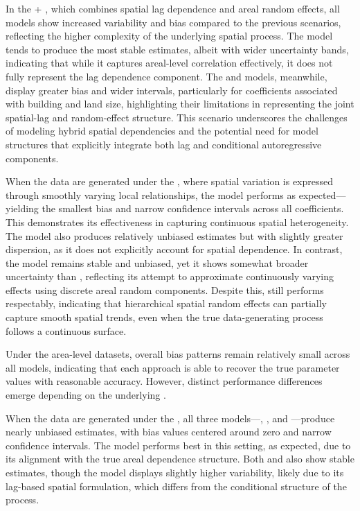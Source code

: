 \documentclass[
  letterpaper,
  DIV=11,
  numbers=noendperiod]{scrartcl}
\begin{document}
In the + , which combines spatial lag
dependence and areal random effects, all models show increased
variability and bias compared to the previous scenarios, reflecting the
higher complexity of the underlying spatial process. The 
model tends to produce the most stable estimates, albeit with wider
uncertainty bands, indicating that while it captures areal-level
correlation effectively, it does not fully represent the lag dependence
component. The  and  models, meanwhile, display
greater bias and wider intervals, particularly for coefficients
associated with building and land size, highlighting their limitations
in representing the joint spatial-lag and random-effect structure. This
scenario underscores the challenges of modeling hybrid spatial
dependencies and the potential need for model structures that explicitly
integrate both lag and conditional autoregressive components.

When the data are generated under the  , where spatial
variation is expressed through smoothly varying local relationships, the
 model performs as expected---yielding the smallest bias and
narrow confidence intervals across all coefficients. This demonstrates
its effectiveness in capturing continuous spatial heterogeneity. The
 model also produces relatively unbiased estimates but with
slightly greater dispersion, as it does not explicitly account for
spatial dependence. In contrast, the  model remains stable
and unbiased, yet it shows somewhat broader uncertainty than ,
reflecting its attempt to approximate continuously varying effects using
discrete areal random components. Despite this,  still
performs respectably, indicating that hierarchical spatial random
effects can partially capture smooth spatial trends, even when the true
data-generating process follows a continuous surface.

Under the area-level datasets, overall bias patterns remain relatively
small across all models, indicating that each approach is able to
recover the true parameter values with reasonable accuracy. However,
distinct performance differences emerge depending on the underlying
.

When the data are generated under the  , all three
models---, , and ---produce nearly unbiased
estimates, with bias values centered around zero and narrow confidence
intervals. The  model performs best in this setting, as
expected, due to its alignment with the true areal dependence structure.
Both  and  also show stable estimates, though the
 model displays slightly higher variability, likely due to its
lag-based spatial formulation, which differs from the conditional
structure of the  process.
\end{document}
